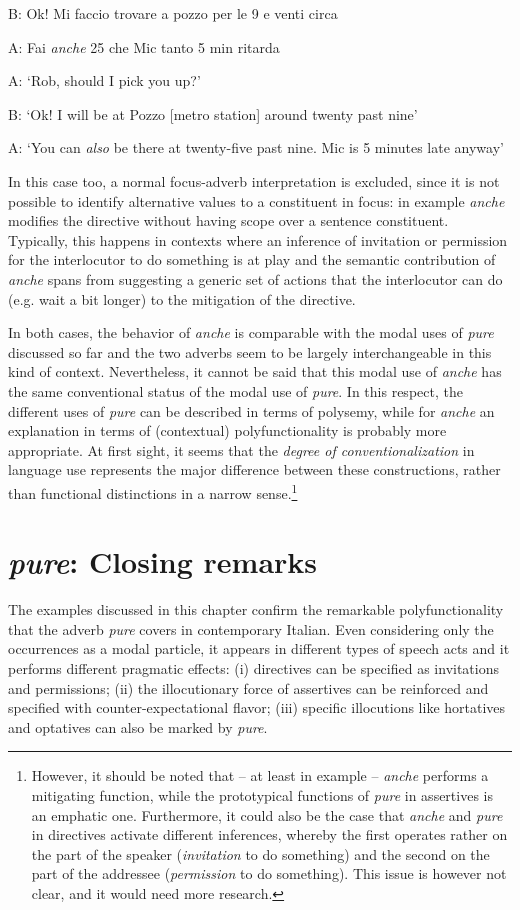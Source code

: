 B:   Ok! Mi faccio trovare a pozzo per le 9 e venti circa

  A:   Fai \textit{anche} 25 che Mic tanto 5 min ritarda

\glt A:  ‘Rob, should I pick you up?’

B:  ‘Ok! I will be at Pozzo [metro station] around twenty past nine’

A:  ‘You can \textit{also} be there at twenty-five past nine. Mic is 5 minutes late anyway’
    \z

In this case too, a normal focus-adverb interpretation is excluded, since it is not possible to identify alternative values to a constituent in focus: in example  \textit{anche} modifies the directive without having scope over a sentence constituent. Typically, this happens in contexts where an inference of invitation or permission for the interlocutor to do something is at play and the semantic contribution of \textit{anche} spans from suggesting a generic set of actions that the interlocutor can do (e.g. wait a bit longer) to the mitigation of the directive.

In both cases, the behavior of \textit{anche} is comparable with the modal uses of \textit{pure} discussed so far and the two adverbs seem to be largely interchangeable in this kind of context. Nevertheless, it cannot be said that this modal use of \textit{anche} has the same conventional status of the modal use of \textit{pure}. In this respect, the different uses of \textit{pure} can be described in terms of polysemy, while for \textit{anche} an explanation in terms of (contextual) polyfunctionality is probably more appropriate. At first sight, it seems that the \textit{degree of conventionalization} in language use represents the major difference between these constructions, rather than functional distinctions in a narrow sense.\footnote{However, it should be noted that – at least in example  – \textit{anche} performs a mitigating function, while the prototypical functions of \textit{pure} in assertives is an emphatic one. Furthermore, it could also be the case that \textit{anche} and \textit{pure} in directives activate different inferences, whereby the first operates rather on the part of the speaker (\textit{invitation} to do something) and the second on the part of the addressee (\textit{permission} to do something). This issue is however not clear, and it would need more research.}

\section{\textit{pure}: Closing remarks}
\hypertarget{Toc124860656}{}
The examples discussed in this chapter confirm the remarkable polyfunctionality that the adverb \textit{pure} covers in contemporary Italian. Even considering only the occurrences as a modal particle, it appears in different types of speech acts and it performs different pragmatic effects: (i) directives can be specified as invitations and permissions; (ii) the illocutionary force of assertives can be reinforced and specified with counter-expectational flavor; (iii) specific illocutions like hortatives and optatives can also be marked by \textit{pure}.


